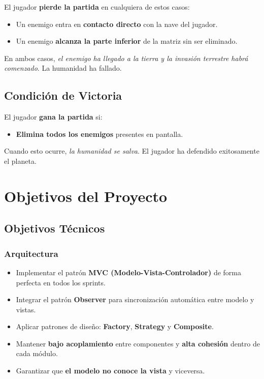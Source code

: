 \documentclass[12pt, a4paper]{article}
\begin{document}
El jugador \textbf{pierde la partida} en cualquiera de estos casos:

\begin{itemize}[leftmargin=2em]
    \item Un enemigo entra en \textbf{contacto directo} con la nave del jugador.
    \item Un enemigo \textbf{alcanza la parte inferior} de la matriz sin ser eliminado.
\end{itemize}

En ambos casos, \textit{el enemigo ha llegado a la tierra y la invasión terrestre habrá comenzado}. La humanidad ha fallado.

\subsection{Condición de Victoria}

El jugador \textbf{gana la partida} si:

\begin{itemize}[leftmargin=2em]
    \item \textbf{Elimina todos los enemigos} presentes en pantalla.
\end{itemize}

Cuando esto ocurre, \textit{la humanidad se salva}. El jugador ha defendido exitosamente el planeta.

\section{Objetivos del Proyecto}

\subsection{Objetivos Técnicos}

\subsubsection{Arquitectura}

\begin{itemize}[leftmargin=2em]
    \item Implementar el patrón \textbf{MVC (Modelo-Vista-Controlador)} de forma perfecta en todos los sprints.
    \item Integrar el patrón \textbf{Observer} para sincronización automática entre modelo y vistas.
    \item Aplicar patrones de diseño: \textbf{Factory}, \textbf{Strategy} y \textbf{Composite}.
    \item Mantener \textbf{bajo acoplamiento} entre componentes y \textbf{alta cohesión} dentro de cada módulo.
    \item Garantizar que \textbf{el modelo no conoce la vista} y viceversa.
\end{itemize}
\end{document}
